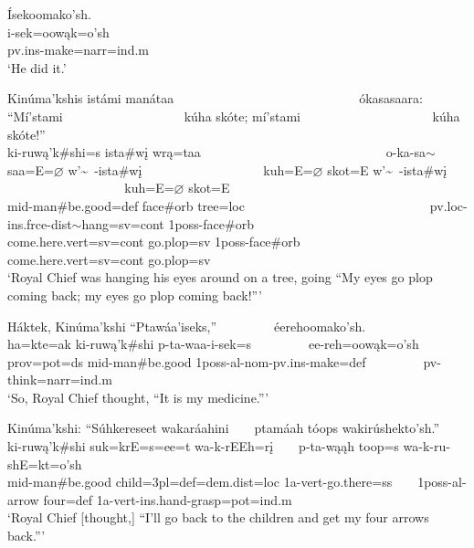 \begin{exe}
\item\label{EJ51} \glll Ísekoomako'sh.\\
i-sek=oowąk=o'sh\\
pv.ins-\textnormal{make}=narr=ind.m\\
\glt `He did it.'

\largerpage
\item\label{EJ52} \glll Kinúma'kshis istámi manátaa ~ ~ ~ ~ ~ ~ ~ ~ ~ ~ ~ ~ ~ ~ ~ ~ ~ ókasasaara: ``Mí'stami ~ ~ ~ ~ ~ ~ ~ ~ ~ ~ ~ kúha skóte; mí'stami ~ ~ ~ ~ ~ ~ ~ ~ ~ ~ ~ ~ kúha skóte!''\\
ki-ruwą'k\#shi=s ista\#wį wrą=taa ~ ~ ~ ~ ~ ~ ~ ~ ~ ~ ~ ~ ~ ~ ~ ~ ~ o-ka-sa$\sim$saa=E=$\varnothing$ w'\~~-ista\#wį ~ ~ ~ ~ ~ ~ ~ ~ ~ ~ ~ kuh=E=$\varnothing$ skot=E w'\~~-ista\#wį ~ ~ ~ ~ ~ ~ ~ ~ ~ ~ ~ ~ kuh=E=$\varnothing$ skot=E\\
mid-\textnormal{man}\#\textnormal{be.good}=def \textnormal{face}\#\textnormal{orb} \textnormal{tree}=loc ~ ~ ~ ~ ~ ~ ~ ~ ~ ~ ~ ~ ~ ~ ~ ~ ~ pv.loc-ins.frce-dist$\sim$\textnormal{hang}=sv=cont 1poss-\textnormal{face}\#\textnormal{orb} ~ ~ ~ ~ ~ ~ ~ ~ ~ ~ ~ \textnormal{come.here}.vert=sv=cont \textnormal{go.plop}=sv 1poss-\textnormal{face}\#\textnormal{orb} ~ ~ ~ ~ ~ ~ ~ ~ ~ ~ ~ ~ \textnormal{come.here}.vert=sv=cont \textnormal{go.plop}=sv\\
\glt `Royal Chief was hanging his eyes around on a tree, going ``My eyes go plop coming back; my eyes go plop coming back!{''}'

\item\label{EJ53} \glll Háktek, Kinúma'kshi ``Ptawáa'iseks,'' ~ ~ ~ ~ ~ éerehoomako'sh.\\
ha=kte=ak ki-ruwą'k\#shi p-ta-waa-i-sek=s ~ ~ ~ ~ ~ ee-reh=oowąk=o'sh\\
prov=pot=ds mid-\textnormal{man}\#\textnormal{be.good} 1poss-al-nom-pv.ins-\textnormal{make}=def ~ ~ ~ ~ ~ pv-\textnormal{think}=narr=ind.m\\
\glt `So, Royal Chief thought, ``It is my medicine.{''}'

\item\label{EJ54} \glll Kinúma'kshi: ``Súhkereseet wakaráahini ~ ~ ptamáah tóops wakirúshekto'sh.''\\
ki-ruwą'k\#shi suk=krE=s=ee=t wa-k-rEEh=rį ~ ~ p-ta-wąąh toop=s wa-k-ru-shE=kt=o'sh\\
mid-\textnormal{man}\#\textnormal{be.good} \textnormal{child}=3pl=def=dem.dist=loc 1a-vert-\textnormal{go.there}=ss ~ ~ 1poss-al-\textnormal{arrow} \textnormal{four}=def 1a-vert-ins.hand-\textnormal{grasp}=pot=ind.m\\
\glt `Royal Chief [thought,] ``I'll go back to the children and get my four arrows back.{''}'


\end{exe}
